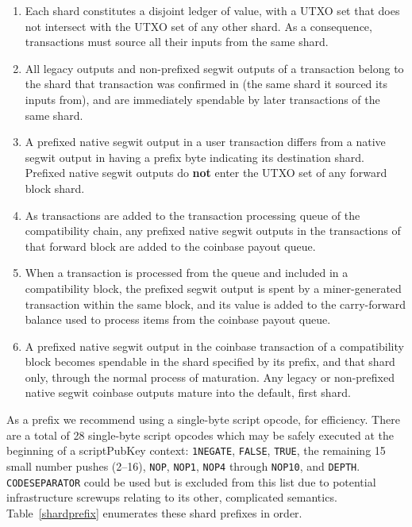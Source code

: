 \begin{enumerate}
  \item
    Each shard constitutes a disjoint ledger of value, with a UTXO set
    that does not intersect with the UTXO set of any other shard.  As
    a consequence, transactions must source all their inputs from the
    same shard.

  \item
    All legacy outputs and non-prefixed segwit outputs of a
    transaction belong to the shard that transaction was confirmed in
    (the same shard it sourced its inputs from), and are immediately
    spendable by later transactions of the same shard.

  \item
    A prefixed native segwit output in a user transaction differs from
    a native segwit output in having a prefix byte indicating its
    destination shard.  Prefixed native segwit outputs do \textbf{not}
    enter the UTXO set of any forward block shard.

  \item
    As transactions are added to the transaction processing queue of
    the compatibility chain, any prefixed native segwit outputs in the
    transactions of that forward block are added to the coinbase
    payout queue.

  \item
    When a transaction is processed from the queue and included in a
    compatibility block, the prefixed segwit output is spent by a
    miner-generated transaction within the same block, and its value
    is added to the carry-forward balance used to process items from
    the coinbase payout queue.

  \item
    A prefixed native segwit output in the coinbase transaction of a
    compatibility block becomes spendable in the shard specified by
    its prefix, and that shard only, through the normal process of
    maturation.  Any legacy or non-prefixed native segwit coinbase
    outputs mature into the default, first shard.
\end{enumerate}

As a prefix we recommend using a single-byte script opcode, for
efficiency.  There are a total of 28 single-byte script opcodes which
may be safely executed at the beginning of a scriptPubKey context:
{\tt 1NEGATE}, {\tt FALSE}, {\tt TRUE}, the remaining \num{15} small
number pushes (\numrange{2}{16}), {\tt NOP}, {\tt NOP1}, {\tt NOP4}
through {\tt NOP10}, and {\tt DEPTH}.  {\tt CODESEPARATOR} could be
used but is excluded from this list due to potential infrastructure
screwups relating to its other, complicated semantics.
Table~\ref{shardprefix} enumerates these shard prefixes in order.

